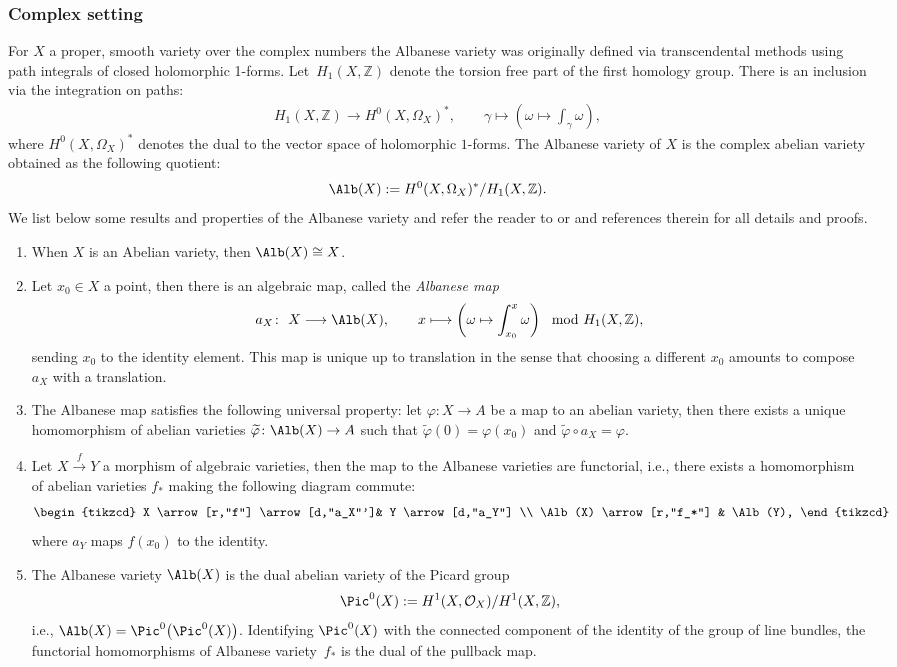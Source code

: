 \subsubsection{Complex setting}
For $X$ a proper, smooth variety over the complex numbers the Albanese variety was originally defined via transcendental methods using path integrals of closed holomorphic 1-forms. Let~$H_1(X,\mathbb Z)$ denote the torsion free part of the first homology group. There is an inclusion via the integration on paths:
\begin{align*}
 H_1(X,\mathbb Z)\longrightarrow H^0(X,\Omega_X)^*,\qquad
 \gamma\longmapsto \left(\omega\mapsto\int_{\gamma}\omega\right),
\end{align*}
where $ H^0(X,\Omega_X)^*$ denotes the dual to the vector space of holomorphic $1$-forms.
The Albanese variety of $X$ is the complex abelian variety obtained as the following quotient:
\[\Alb(X):=H^0(X,\Omega_X)^*\slash H_1(X,\mathbb Z). \]
We list below some results and properties of the Albanese variety and refer the reader to \cite[Section~11.11]{birkenhake} or \cite{mumford1974abelian} and references therein for all details and proofs.
\begin{enumerate}\itemsep=0pt
 \item[(1)] When $X$ is an Abelian variety, then $\Alb(X)\cong X$.
 \item[(2)] Let $x_0\in X$ a point, then there is an algebraic map, called the \emph{Albanese map}
 \begin{align*}
 a_{X}\colon \ X\longrightarrow \Alb(X),\qquad
 x\longmapsto\left(\omega\mapsto\int_{x_0}^x\omega\right) \mod H_1(X,\mathbb Z),
 \end{align*}
 sending $x_0$ to the identity element. This map is unique up to translation in the sense that choosing a different $x_0$ amounts to compose $a_X$ with a translation.
 \item[(3)] The Albanese map satisfies the following universal property:
 let $\varphi\colon X\to A$ be a map to an abelian variety, then there exists a unique homomorphism of abelian varieties $\widetilde{\varphi}\colon \Alb(X)\to A $ such that $\widetilde{\varphi}(0)=\varphi(x_0)$ and $\widetilde{\varphi}\circ a_{X}=\varphi$.
 \item[(4)] Let $X\xrightarrow{f} Y$ a morphism of algebraic varieties, then the map to the Albanese varieties are functorial, i.e., there exists a homomorphism of abelian varieties $f_*$ making the following diagram commute:
 \[
 \begin{tikzcd}
 X \arrow[r,"f"] \arrow[d,"a_X"']& Y \arrow[d,"a_Y"] \\
 \Alb(X) \arrow[r,"f_*"] & \Alb(Y),
 \end{tikzcd}
\]
 where $a_Y$ maps $f(x_0)$ to the identity.
 \item[(5)] The Albanese variety $\Alb(X)$ is the dual abelian variety of the Picard group
 \[\Pic^0(X):=H^1(X,\mathcal O_X)\slash H^1(X,\mathbb Z), \]
 i.e.,
 $\Alb(X)=\Pic^0\bigl(\Pic^0(X)\bigr)$.
 Identifying $\Pic^0(X)$ with the connected component of the identity of the group of line bundles, the functorial homomorphisms of Albanese variety~$f_*$ is the dual of the pullback map.
\end{enumerate}

